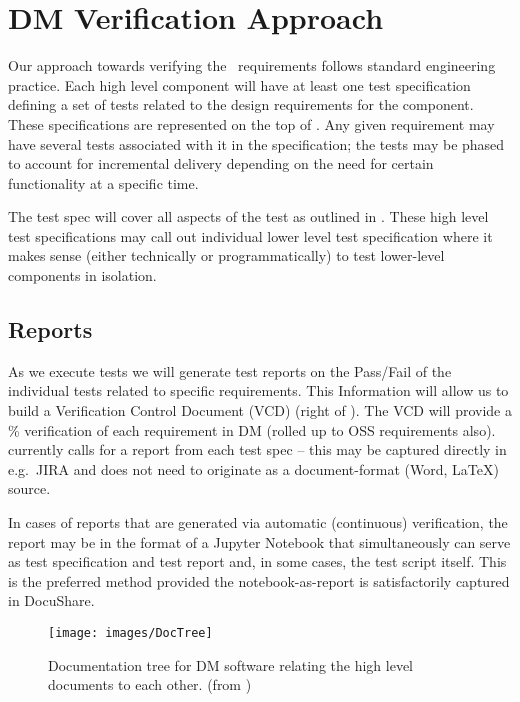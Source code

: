 \section{DM Verification Approach \label{sect:approach}}

Our approach towards verifying the \product\ requirements follows
standard engineering practice.  Each high level component will have at
least one test specification defining a set of tests related to the
design requirements for the component.  These specifications are
represented on the top of . Any given requirement
may have several tests associated with it in the specification; the
tests may be phased to account for incremental delivery depending on
the need for certain functionality at a specific time.

The test spec will cover all aspects of the test as outlined in
. These high level test specifications may call
out individual lower level test specification where it makes sense
(either technically or programmatically) to test lower-level components
in isolation.

\subsection{Reports}

As we execute tests we will generate test reports on the Pass/Fail of the individual tests related to specific requirements.
This Information will allow us to build a Verification Control Document (VCD) (right of ).
The VCD will provide a \% verification of each requirement in DM (rolled up to OSS requirements also).
 currently calls for a report from each test spec -- this may be captured directly in e.g.\ JIRA and does not need to originate as a document-format (Word, LaTeX) source.

In cases of reports that are generated via automatic (continuous) verification, the report may be in the format of a Jupyter Notebook that simultaneously can serve as test specification and test report and, in some cases, the test script itself. This is the preferred method provided the notebook-as-report is satisfactorily captured in DocuShare.


\begin{figure}
\begin{center}
 \texttt{[image: images/DocTree]}
 \caption{Documentation tree for DM software relating the high level documents to each other. (from )\label{fig:doctree}}

 \end{center}
 \end{figure}

